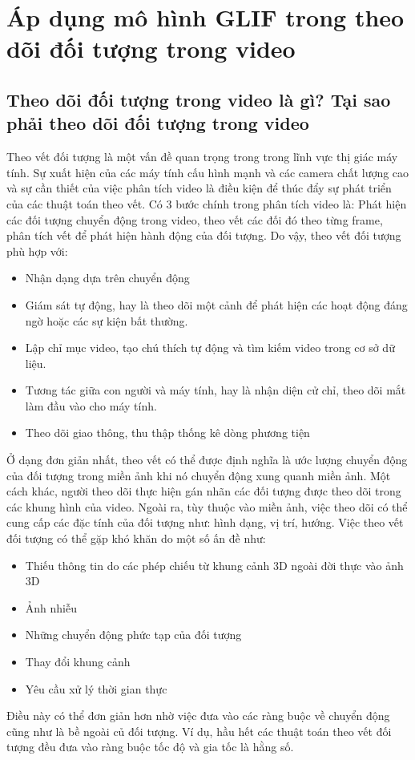 \documentclass[12pt, oneside, a4]{book}
\begin{document}
\chapter{Áp dụng mô hình GLIF trong theo dõi đối tượng trong video }
\section{Theo dõi đối tượng trong video là gì? Tại sao phải theo dõi đối tượng trong video}
Theo vết đối tượng là một vấn đề quan trọng trong trong lĩnh vực thị giác máy tính. Sự xuất hiện của các máy tính cấu hình mạnh và các camera chất lượng cao và sự cần thiết của việc phân tích video  là điều kiện để thúc đẩy sự phát triển của các thuật toán theo vết. Có 3 bước chính trong phân tích video là: Phát hiện các đối tượng chuyển động trong video, theo vết các đối đó theo từng frame, phân tích vết để phát hiện hành động của đối tượng. Do vậy, theo vết đối tượng phù hợp với: 
\begin{itemize}
\item Nhận dạng dựa trên chuyển động
\item Giám sát tự động, hay là theo dõi một cảnh để phát hiện các hoạt động đáng ngờ hoặc các sự kiện bất thường.
\item Lập chỉ mục video, tạo chú thích tự động và tìm kiếm video trong cơ sở dữ liệu.
\item Tương tác giữa con người và máy tính, hay là nhận diện cử chỉ, theo dõi mắt làm đầu vào cho máy tính. 
\item Theo dõi giao thông, thu thập thống kê dòng phương tiện
\end{itemize}
Ở dạng đơn giản nhất, theo vết có thể được định nghĩa là ước lượng chuyển động của đối tượng trong miền ảnh khi nó chuyển động xung quanh miền ảnh. Một cách khác, người theo dõi thực hiện gán nhãn các đối tượng được theo dõi trong các khung hình của video. Ngoài ra, tùy thuộc vào miền ảnh, việc theo dõi có thể cung cấp các đặc tính của đối tượng như: hình dạng, vị trí, hướng. Việc theo vết đối tượng có thể gặp khó khăn do một số ấn đề như: 
\begin{itemize}
\item Thiếu thông tin do các phép chiếu từ khung cảnh 3D ngoài đời thực vào ảnh 3D
\item Ảnh nhiễu
\item Những chuyển động phức tạp của đối tượng
\item Thay đổi khung cảnh
\item Yêu cầu xử lý thời gian thực
\end{itemize} 
Điều này có thể đơn giản hơn nhờ việc đưa vào các ràng buộc về chuyển động cũng như là bề ngoài củ đối tượng. Ví dụ, hầu hết các thuật toán theo vết đối tượng đều đưa vào ràng buộc tốc độ và gia tốc là hằng số. 
\end{document}

